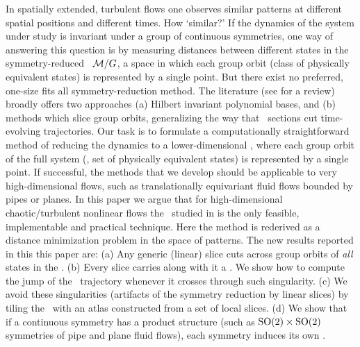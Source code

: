 

In spatially extended, turbulent flows one observes
similar patterns at different spatial positions and different times.
How `similar?' If the dynamics of the system under study is invariant under
a group of continuous symmetries, one way of answering this question is by
measuring distances between different states in the
symmetry-reduced \statesp\ $\pS/\Group$, a space in which each group orbit (class
of physically equivalent states) is represented by a single point.
But there exist no preferred, one-size fits all
symmetry-reduction method. The literature
(see  for a review) broadly
offers two approaches (a) Hilbert invariant polynomial bases, and (b) methods which
slice group orbits, generalizing the way that \Poincare\ sections cut
time-evolving trajectories.
%
Our task is to formulate a computationally straightforward method of reducing
the dynamics to a lower-dimensional \statesp, where each group orbit of
the full system (\ie, set of physically equivalent states) is
represented by a single point. If successful, the methods that we develop
should be applicable to very high-dimensional flows, such as
translationally equivariant fluid flows bounded by pipes or
planes.
%
In this paper we argue that for high-dimensional chaotic/turbulent
nonlinear flows the \mslices\ studied in
 is the only feasible,
implementable and practical technique.
Here the method is rederived as a distance minimization problem in the
space of patterns. The new results reported in this this paper are:
    (a) Any generic (linear) slice cuts across group orbits of {\em all}
        states in the \statesp.
    (b) Every slice carries along with it a {\sset}. We show how to
        compute the jump of the \reducedsp\ trajectory whenever it crosses
        through such singularity.
    (c) We avoid these singularities (artifacts of the symmetry
        reduction by linear slices) by tiling the \statesp\ with an atlas
        constructed from a set of local slices.
	(d) We show that if a continuous symmetry has a product structure
	   (such as $\textrm{SO}(2) \times \textrm{SO}(2)$ symmetries of pipe and plane
	   fluid flows), each symmetry induces its own {\sset}.

